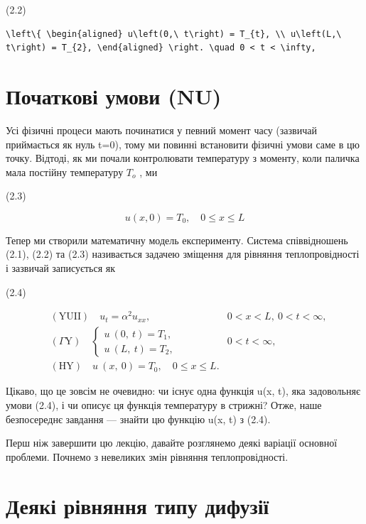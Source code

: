 \documentclass[
  ukrainian,
]{article}
\begin{document}
(2.2)

\begin{verbatim}
\left\{ \begin{aligned} u\left(0,\ t\right) = T_{t}, \\ u\left(L,\ t\right) = T_{2}, \end{aligned} \right. \quad 0 < t < \infty,
\end{verbatim}

\section{Початкові умови
(NU)}\label{ux43fux43eux447ux430ux442ux43aux43eux432ux456-ux443ux43cux43eux432ux438-nu}

Усі фізичні процеси мають починатися у певний момент часу (зазвичай
приймається як нуль t=0), тому ми повинні встановити фізичні умови саме
в цю точку. Відтоді, як ми почали контролювати температуру з моменту,
коли паличка мала постійну температуру \(T_{\mathrm{ }o}\) , ми

(2.3)

\[
u(x, 0) = T_0, \quad 0 \le x \le L
\]

Тепер ми створили математичну модель експерименту. Система співвідношень
(2.1), (2.2) та (2.3) називається задачею зміщення для рівняння
теплопровідності і зазвичай записується як

(2.4)

\[
\begin{aligned} & (\text{YUII}) \quad u_t = \alpha^2 u_{xx}, & 0 < x < L, \ 0 < t < \infty, \\ & \left( \Gamma \text{Y} \right) \quad \begin{cases} u \ (0, \ t) = T_1, \\ u \ (L, \ t) = T_2, \end{cases} & 0 < t < \infty, \\ & (\text{HY}) \quad u \ (x, \ 0) = T_0, \quad 0 \leqslant x \leqslant L. \end{aligned}
\]

Цікаво, що це зовсім не очевидно: чи існує одна функція u(x, t), яка
задовольняє умови (2.4), і чи описує ця функція температуру в стрижні?
Отже, наше безпосереднє завдання --- знайти цю функцію u(x, t) з (2.4).

Перш ніж завершити цю лекцію, давайте розглянемо деякі варіації основної
проблеми. Почнемо з невеликих змін рівняння теплопровідності.

\section{Деякі рівняння типу
дифузії}\label{ux434ux435ux44fux43aux456-ux440ux456ux432ux43dux44fux43dux43dux44f-ux442ux438ux43fux443-ux434ux438ux444ux443ux437ux456ux457}
\end{document}

